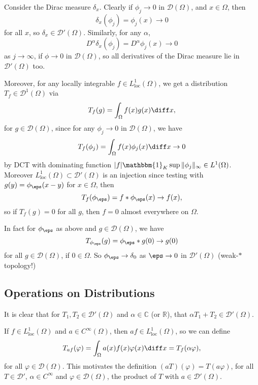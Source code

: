 \documentclass[12pt]{article}
\begin{document}
\begin{exbox}
	Consider the Dirac measure $\delta_x$. Clearly if $\phi_j \to 0$ in $\mathcal{D}(\Omega)$, and $x \in \Omega$, then
	\[
	\delta_x(\phi_j) = \phi_j(x) \to 0
	\]
	for all $x$, so $\delta_x \in \mathcal{D}'(\Omega)$. Similarly, for any $\alpha$,
	\[
	D^\alpha \delta_x (\phi_j) = D^\alpha \phi_j(x) \to 0
	\]
	as $j \to \infty$, if $\phi \to 0$ in $\mathcal{D}(\Omega)$, so all derivatives of the Dirac measure lie in $\mathcal{D}'(\Omega)$ too.

	Moreover, for any locally integrable $f \in L^{1}_{\mathrm{loc}}(\Omega)$, we get a distribution $T_f \in \mathcal{D}^1(\Omega)$ via
	\[
	T_f(g) = \int_{\Omega}f(x) g(x) \diff x,
	\]
	for $g \in \mathcal{D}(\Omega)$, since for any $\phi_j \to 0$ in $\mathcal{D}(\Omega)$, we have
	\[
	T_f(\phi_j) = \int_{\Omega} f(x) \phi_j(x) \diff x \to 0
	\]
	by DCT with dominating function $|f|\mathbbm{1}_{K} \sup \|\phi_j\|_{\infty} \in L^1(\Omega)$. Moreover $L^1_{\mathrm{loc}}(\Omega) \subset \mathcal{D}'(\Omega)$ is an injection since testing with $g(y) = \phi_\eps(x - y)$ for $x \in \Omega$, then
	\[
	T_f(\phi_\eps) = f \ast \phi_\eps(x) \to f(x),
	\]
	so if $T_f(g) = 0$ for all $g$, then $f = 0$ almost everywhere on $\Omega$.

	In fact for $\phi_\eps$ as above and $g \in \mathcal{D}(\Omega)$, we have
	\[
	T_{\phi_\eps}(g) = \phi_\eps \ast g(0) \to g(0)
	\]
	for all $g \in \mathcal{D}(\Omega)$, if $0 \in \Omega$. So $\phi_\eps \to \delta_0$ as $\eps \to 0$ in $\mathcal{D}'(\Omega)$ (weak-$\ast$ topology!)
\end{exbox}

\subsection{Operations on Distributions}
\label{sub:dist_op}

It is clear that for $T_1, T_2 \in \mathcal{D}'(\Omega)$ and $\alpha \in \mathbb{C}$ (or $\mathbb{R}$), that $\alpha T_1 + T_2 \in \mathcal{D}'(\Omega)$.

If $f \in L^1_{\mathrm{loc}}(\Omega)$ and $a \in C^\infty(\Omega)$, then $af \in L^1_{\mathrm{loc}}(\Omega)$, so we can define
\[
T_{af}(\varphi) = \int_{\Omega} a(x) f(x) \varphi(x) \diff x = T_f(\alpha \varphi),
\]
for all $\varphi \in \mathcal{D}(\Omega)$. This motivates the definition $(a T)(\varphi) = T(a \varphi)$, for all $T \in \mathcal{D}'$, $\alpha \in C^\infty$ and $\varphi \in \mathcal{D}(\Omega)$, the product of $T$ with $a \in \mathcal{D}'(\Omega)$.
\end{document}
